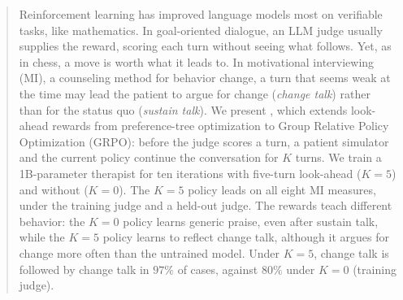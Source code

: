 \begin{abstract}
Reinforcement learning has improved language models most on verifiable tasks, like mathematics. In
goal-oriented dialogue, an LLM judge usually supplies the reward, scoring each turn without seeing
what follows. Yet, as in chess, a move is worth what it leads to. In motivational interviewing
(MI), a counseling method for behavior change, a turn that seems weak at the time may lead the
patient to argue for change (\emph{change talk}) rather than for the status quo (\emph{sustain
talk}). We present \textbf{\LAGRPO}, which extends look-ahead rewards from preference-tree
optimization to Group Relative Policy Optimization (GRPO): before the judge scores a turn, a
patient simulator and the current policy continue the conversation for $K$ turns. We train a
1B-parameter therapist for ten iterations with five-turn look-ahead ($K{=}5$) and without
($K{=}0$). The $K{=}5$ policy leads on all eight MI measures, under the training judge and a
held-out judge. The rewards teach different behavior: the $K{=}0$ policy learns generic praise, even
after sustain talk, while the $K{=}5$ policy learns to reflect change talk, although it argues for
change more often than the untrained model. Under $K{=}5$, change talk is followed by change talk
in $97\%$ of cases, against $80\%$ under $K{=}0$ (training judge).
\end{abstract}
